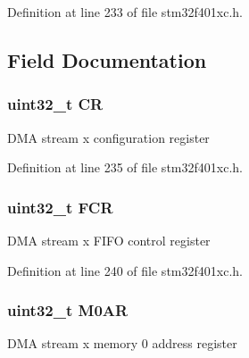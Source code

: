 Definition at line 233 of file stm32f401xc.\+h.



\subsection{Field Documentation}
\subsubsection[{\texorpdfstring{CR}{CR}}]{ uint32\+\_\+t CR}\hypertarget{struct_d_m_a___stream___type_def_ab40c89c59391aaa9d9a8ec011dd0907a}{}\label{struct_d_m_a___stream___type_def_ab40c89c59391aaa9d9a8ec011dd0907a}
D\+MA stream x configuration register 

Definition at line 235 of file stm32f401xc.\+h.

\subsubsection[{\texorpdfstring{F\+CR}{FCR}}]{ uint32\+\_\+t F\+CR}\hypertarget{struct_d_m_a___stream___type_def_a5d5cc7f32884945503dd29f8f6cbb415}{}\label{struct_d_m_a___stream___type_def_a5d5cc7f32884945503dd29f8f6cbb415}
D\+MA stream x F\+I\+FO control register 

Definition at line 240 of file stm32f401xc.\+h.

\subsubsection[{\texorpdfstring{M0\+AR}{M0AR}}]{ uint32\+\_\+t M0\+AR}\hypertarget{struct_d_m_a___stream___type_def_a63b4d166f4ab5024db6b493a7ab7b640}{}\label{struct_d_m_a___stream___type_def_a63b4d166f4ab5024db6b493a7ab7b640}
D\+MA stream x memory 0 address register 


